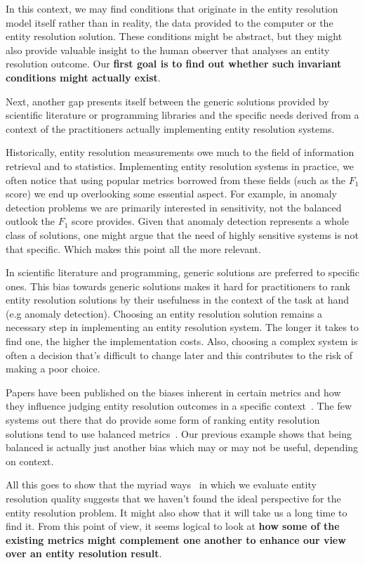 In this context, we may find conditions that originate in the entity resolution
model itself rather than in reality, the data provided to the computer or the
entity resolution solution.
These conditions might be abstract, but they might also provide valuable
insight to the human observer that analyses an entity resolution outcome.
Our \textbf{first goal is to find out whether such invariant conditions might
actually exist}.

Next, another gap presents itself between the generic solutions provided by
scientific literature or programming libraries and the specific needs derived
from a context of the practitioners actually implementing entity resolution
systems.

Historically, entity resolution measurements owe much to the field of
information retrieval and to statistics.
Implementing entity resolution systems in practice, we often notice that
using popular metrics borrowed from these fields (such as the $F_1$ score) we
end up overlooking some essential aspect.
For example, in anomaly detection problems we are primarily interested in
sensitivity, not the balanced outlook the $F_1$ score provides.
Given that anomaly detection represents a whole class of solutions, one might
argue that the need of highly sensitive systems is not that specific.
Which makes this point all the more relevant.

In scientific literature and programming, generic solutions are preferred to
specific ones.
This bias towards generic solutions makes it hard for practitioners to rank
entity resolution solutions by their usefulness in the context of the task
at hand (e.g anomaly detection).
Choosing an entity resolution solution remains a necessary step in
implementing an entity resolution system.
The longer it takes to find one, the higher the implementation costs.
Also, choosing a complex system is often a decision that's difficult to
change later and this contributes to the risk of making a poor choice.

Papers have been published on the biases inherent in certain metrics
and how they influence judging entity resolution outcomes in a specific
context~\cite{Goga2015}.
The few systems out there that do provide some form of ranking entity
resolution solutions tend to use balanced metrics~\cite{papwithcode2019}.
Our previous example shows that being balanced is actually just another bias
which may or may not be useful, depending on context.

All this goes to show that the myriad ways~\cite{hitesh2012} in which we
evaluate entity resolution quality suggests that we haven't found the ideal
perspective for the entity resolution problem.
It might also show that it will take us a long time to find it.
From this point of view, it seems logical to look at \textbf{how some of the
existing metrics might complement one another to enhance our view over an entity
resolution result}.

